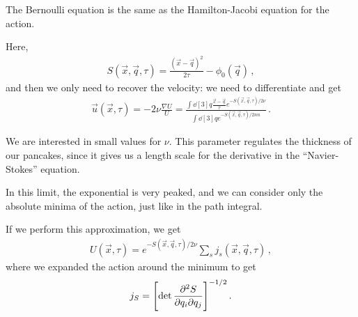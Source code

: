 \documentclass[main.tex]{subfiles}
\begin{document}
The Bernoulli equation is the same as the Hamilton-Jacobi equation for the action.

Here, 
%
\begin{align}
S(\vec{x}, \vec{q}, \tau ) = \frac{(\vec{x} - \vec{q})^2}{2 \tau } - \phi_0 (\vec{q})
\,,
\end{align}
%
and then we only need to recover the velocity: we need to differentiate and get 
%
\begin{align}
\vec{u} (\vec{x}, \tau ) = - 2 \nu \frac{\nabla U }{U }
= \frac{ \int \dd[3]{q}\frac{\vec{x} - \vec{q}}{\tau } e^{- S(\vec{x}, \vec{q}, \tau ) / 2 \nu }}{ \int \dd[3]{q} e^{- S (\vec{x}, \vec{q}, \tau ) / 2 nn}}
\,.
\end{align}

We are interested in small values for \(\nu \). This parameter regulates the thickness of our pancakes, since it gives us a length scale for the derivative in the ``Navier-Stokes'' equation.

In this limit, the exponential is very peaked, and we can consider only the absolute minima of the action, just like in the path integral. 

If we perform this approximation, we get 
%
\begin{align}
U(\vec{x}, \tau ) = e^{ - S(\vec{x}, \vec{q}, \tau )  / 2 \nu } \sum _{s} j_s (\vec{x}, \vec{q}, \tau )
\,,
\end{align}
%
where we expanded the action around the minimum to get 
%
\begin{align}
j_S = \qty[\det \pdv[2]{S}{q_{i}}{q_{j}}]^{- 1/2}
\,.
\end{align}
\end{document}
